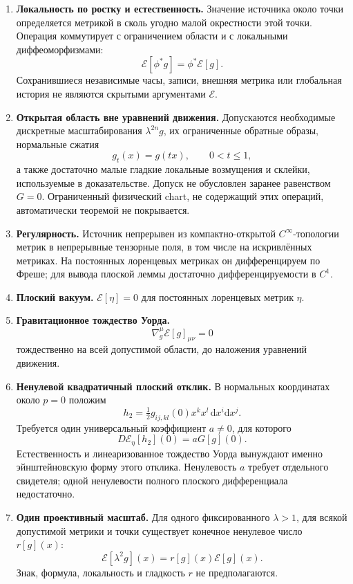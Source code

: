 \documentclass[11pt,a4paper]{article}
\newcommand{\E}{\mathcal E}
\newcommand{\dd}{\mathrm d}
\begin{document}
\begin{enumerate}
\item \textbf{Локальность по ростку и естественность.} Значение источника около точки определяется метрикой в сколь угодно малой окрестности этой точки. Операция коммутирует с ограничением области и с локальными диффеоморфизмами:
\[
\E[\phi^*g]=\phi^*\E[g].
\]
Сохранившиеся независимые часы, записи, внешняя метрика или глобальная история не являются скрытыми аргументами $\E$.

\item \textbf{Открытая область вне уравнений движения.} Допускаются необходимые дискретные масштабирования $\lambda^{2n}g$, их ограниченные обратные образы, нормальные сжатия
\[
g_t(x)=g(tx),\qquad 0<t\le1,
\]
а также достаточно малые гладкие локальные возмущения и склейки, используемые в доказательстве. Допуск не обусловлен заранее равенством $G=0$. Ограниченный физический chart, не содержащий этих операций, автоматически теоремой не покрывается.

\item \textbf{Регулярность.} Источник непрерывен из компактно-открытой $C^\infty$-топологии метрик в непрерывные тензорные поля, в том числе на искривлённых метриках. На постоянных лоренцевых метриках он дифференцируем по Фреше; для вывода плоской леммы достаточно дифференцируемости в $C^1$.

\item \textbf{Плоский вакуум.} $\E[\eta]=0$ для постоянных лоренцевых метрик $\eta$.

\item \textbf{Гравитационное тождество Уорда.}
\[
\nabla_g^\mu \E[g]_{\mu\nu}=0
\]
тождественно на всей допустимой области, до наложения уравнений движения.

\item \textbf{Ненулевой квадратичный плоский отклик.} В нормальных координатах около $p=0$ положим
\[
h_2=\tfrac12 g_{ij,kl}(0)x^kx^l\,\dd x^i\dd x^j.
\]
Требуется один универсальный коэффициент $a\ne0$, для которого
\[
D\E_\eta[h_2](0)=aG[g](0).
\]
Естественность и линеаризованное тождество Уорда вынуждают именно эйнштейновскую форму этого отклика. Ненулевость $a$ требует отдельного свидетеля; одной ненулевости полного плоского дифференциала недостаточно.

\item \textbf{Один проективный масштаб.} Для одного фиксированного $\lambda>1$, для всякой допустимой метрики и точки существует конечное ненулевое число $r[g](x)$:
\[
\E[\lambda^2g](x)=r[g](x)\E[g](x).
\]
Знак, формула, локальность и гладкость $r$ не предполагаются.
\end{enumerate}
\end{document}
